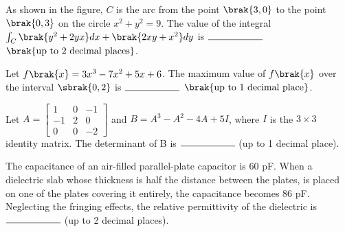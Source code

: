 	\item As shown in the figure, $C$ is the arc from the point $\brak{3,0}$ to the point $\brak{0,3}$ on the circle $x^2 + y^2 = 9$. The value of the integral $\int_{C} \brak{y^2+2yx}dx + \brak{2xy+x^2}dy$ is $\rule{2cm}{0.4pt}$ $\brak{\text{up to 2 decimal places}}$.\\
\begin{figure}[H]
    \centering

\end{figure}
		

	\item Let $f\brak{x}=3x^3-7x^2+5x+6$. The maximum value of $f\brak{x}$ over the interval $\sbrak{0, 2}$ is $\rule{2cm}{0.4pt}$ $\brak{\text{up to 1 decimal place}}$.\\

	\item Let $A = \begin{bmatrix} 
	1 & 0 & -1 \\
	-1 & 2 & 0 \\
	0 & 0 & -2
	\end{bmatrix}$ and $B = A^3 - A^2 - 4A + 5I$, where $I$ is the $3\times3$ identity matrix. The determinant of B is $\rule{2cm}{0.4pt}$ (up to 1 decimal place).\\

        \item The capacitance of an air-filled parallel-plate capacitor is $60$ pF. When a dielectric slab whose thickness is half the distance between the plates, is placed on one of the plates covering it entirely, the capacitance becomes $86$ pF. Neglecting the fringing effects, the relative permittivity of the dielectric is $\rule{2cm}{0.4pt}$ (up to 2 decimal places).\\

